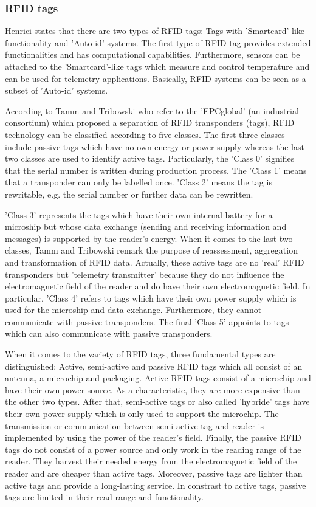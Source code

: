 \subsubsection{RFID tags} \label{tag}

Henrici \cite{henrici} states that there are two types of RFID tags: Tags with 'Smartcard'-like functionality and 'Auto-id' systems. The first type of RFID tag provides extended functionalities and has computational capabilities. Furthermore, sensors can be attached to the 'Smartcard'-like tags which measure and control temperature and can be used for telemetry applications. Basically, RFID systems can be seen as a subset of 'Auto-id' systems.

According to Tamm and Tribowski \cite[p.15 ff.]{fokus} who refer to the 'EPCglobal' (an industrial consortium) which proposed a separation of RFID transponders (tags), RFID technology can be classified according to five classes\label{classes}. The first three classes include passive tags which have no own energy or power supply whereas the last two classes are used to identify active tags. Particularly, the 'Class 0' signifies that the serial number is written during production process. The 'Class 1' means that a transponder can only be labelled once. 'Class 2' means the tag is rewritable, e.g. the serial number or further data can be rewritten. 

'Class 3' represents the tags which have their own internal battery for a microship but whose data exchange (sending and receiving information and messages) is supported by the reader's energy. When it comes to the last two classes, Tamm and Tribowski remark the purpose of reassessment, aggregation and transformation of RFID data. Actually, these active tags are no 'real' RFID transponders but 'telemetry transmitter' because they do not influence the electromagnetic field of the reader and do have their own electromagnetic field. In particular, 'Class 4' refers to tags which have their own power supply which is used for the microship and data exchange. Furthermore, they cannot communicate with passive transponders. The final 'Class 5' appoints to tags which can also communicate with passive transponders. 

When it comes to the variety of RFID tags, three fundamental types are distinguished: Active, semi-active and passive RFID tags \cite{henrici} which all consist of an antenna, a microchip and packaging. Active RFID tags consist of a microchip and have their own power source. As a characteristic, they are more expensive than the other two types. After that, semi-active tags or also called 'hybride' tags have their own power supply which is only used to support the microchip. The transmission or communication between semi-active tag and reader is implemented by using the power of the reader's field. Finally, the passive RFID tags do not consist of a power source and only work in the reading range of the reader. They harvest their needed energy from the electromagnetic field of the reader and are cheaper than active tags. Moreover, passive tags are lighter than active tags and provide a long-lasting service. In constrast to active tags, passive tags are limited in their read range and functionality.

